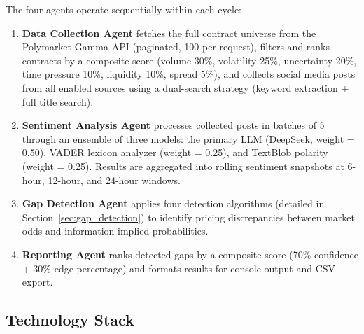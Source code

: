 \documentclass[12pt, letterpaper]{article}
\begin{document}
The four agents operate sequentially within each cycle:

\begin{enumerate}
    \item \textbf{Data Collection Agent} fetches the full contract universe from the Polymarket Gamma API (paginated, 100 per request), filters and ranks contracts by a composite score (volume 30\%, volatility 25\%, uncertainty 20\%, time pressure 10\%, liquidity 10\%, spread 5\%), and collects social media posts from all enabled sources using a dual-search strategy (keyword extraction + full title search).

    \item \textbf{Sentiment Analysis Agent} processes collected posts in batches of 5 through an ensemble of three models: the primary LLM (DeepSeek, weight = 0.50), VADER lexicon analyzer (weight = 0.25), and TextBlob polarity (weight = 0.25). Results are aggregated into rolling sentiment snapshots at 6-hour, 12-hour, and 24-hour windows.

    \item \textbf{Gap Detection Agent} applies four detection algorithms (detailed in Section~\ref{sec:gap_detection}) to identify pricing discrepancies between market odds and information-implied probabilities.

    \item \textbf{Reporting Agent} ranks detected gaps by a composite score (70\% confidence + 30\% edge percentage) and formats results for console output and CSV export.
\end{enumerate}

\subsection{Technology Stack}
\end{document}
